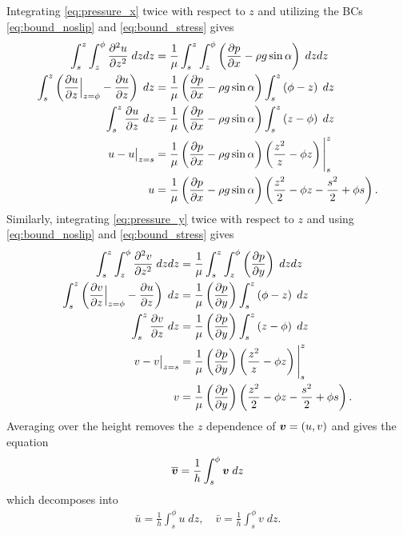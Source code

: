 Integrating \cref{eq:pressure_x} twice with respect to $z$ and utilizing the BCs \cref{eq:bound_noslip} and \cref{eq:bound_stress} gives
\begin{align}
    \nonumber \int_{s}^{z}\int_{z}^{\phi} \pderivtwo{u}{z} \; dzdz &= \frac{1}{\mu}\int_{s}^{z}\int_{z}^{\phi} \lrp{\pderiv{p}{x} - \rho g \sin\alpha} \; dzdz \\
    \nonumber \int_{s}^{z} \lrp{\evalat[\Big]{\pderiv{u}{z}}{z = \phi} - \pderiv{u}{z}} \; dz &= \frac{1}{\mu} \lrp{\pderiv{p}{x} - \rho g \sin\alpha} \int_{s}^{z}\lrp{\phi - z} \; dz\\
    \nonumber \int_{s}^{z} \pderiv{u}{z} \; dz &= \frac{1}{\mu} \lrp{\pderiv{p}{x} - \rho g \sin\alpha} \int_{s}^{z} \lrp{z - \phi} \; dz\\
    \nonumber u - \evalat{u}{z = s} &= \frac{1}{\mu} \lrp{\pderiv{p}{x} - \rho g \sin\alpha}  \lrp{\frac{z^2}{z} - \phi z} \Bigg|_{s}^z\\
    u &= \frac{1}{\mu} \lrp{\pderiv{p}{x} - \rho g \sin\alpha} \lrp{\frac{z^2}{2} - \phi z - \frac{s^2}{2} + \phi s}. 
    \label{eq:vel_u}
\end{align}
Similarly, integrating \cref{eq:pressure_y} twice with respect to $z$ and using \cref{eq:bound_noslip} and \cref{eq:bound_stress} gives
\begin{align}
    \nonumber \int_{s}^{z}\int_{z}^{\phi} \pderivtwo{v}{z} \; dzdz &= \frac{1}{\mu}\int_{s}^{z}\int_{z}^{\phi} \lrp{\pderiv{p}{y}} \; dzdz \\
    \nonumber \int_{s}^{z} \lrp{\evalat[\Big]{\pderiv{v}{z}}{z = \phi} - \pderiv{u}{z}} \; dz &= \frac{1}{\mu} \lrp{\pderiv{p}{y}} \int_{s}^{z}\lrp{\phi - z} \; dz\\
    \nonumber \int_{s}^{z} \pderiv{v}{z} \; dz &= \frac{1}{\mu} \lrp{\pderiv{p}{y}} \int_{s}^{z} \lrp{z - \phi} \; dz\\
    \nonumber v - \evalat{v}{z = s} &= \frac{1}{\mu} \lrp{\pderiv{p}{y}}  \lrp{\frac{z^2}{z} - \phi z} \Bigg|_{s}^z\\
    v &= \frac{1}{\mu} \lrp{\pderiv{p}{y}} \lrp{\frac{z^2}{2} - \phi z - \frac{s^2}{2} + \phi s}. 
    \label{eq:vel_v}
\end{align}
Averaging over the height removes the $z$ dependence of $\boldsymbol{v} = \left( u, v \right)$ and gives the equation 
\begin{equation*}
    \overline{\boldsymbol{v}} = \frac{1}{h} \int_{s}^{\phi} \boldsymbol{v} \; dz
\end{equation*}
which decomposes into 
\begin{align}
    \bar{u} =  \frac{1}{h} \int_{s}^{\phi} u \; dz, \quad \bar{v} =  \frac{1}{h} \int_{s}^{\phi} v \; dz. 
    \label{eq:uv_bar_ints}
\end{align}
